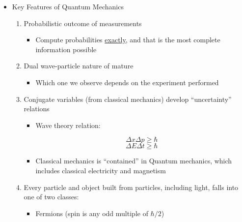 \begin{itemize}

  \item Key Features of Quantum Mechanics

    \begin{enumerate}

      \item Probabilistic outcome of measurements

        \begin{itemize}

          \item Compute probabilities \underline{exactly}, and that is the most complete information possible

        \end{itemize}

      \item Dual wave-particle nature of mature

        \begin{itemize}

          \item Which one we observe depends on the experiment performed

        \end{itemize}

      \item Conjugate variables (from classical mechanics) develop ``uncertainty'' relations

        \begin{itemize}

          \item Wave theory relation:

            $$\Delta x\Delta p\geq \hbar$$
            $$\Delta E \Delta t\geq \hbar$$

          \item Classical mechanics is ``contained'' in Quantum mechanics, which includes classical electricity and magnetism

        \end{itemize}

      \item Every particle and object built from particles, including light, falls into one of two classes:

        \begin{itemize}

          \item Fermions (spin is any odd multiple of $\hbar/2$)


\end{itemize}
\end{enumerate}
\end{itemize}
